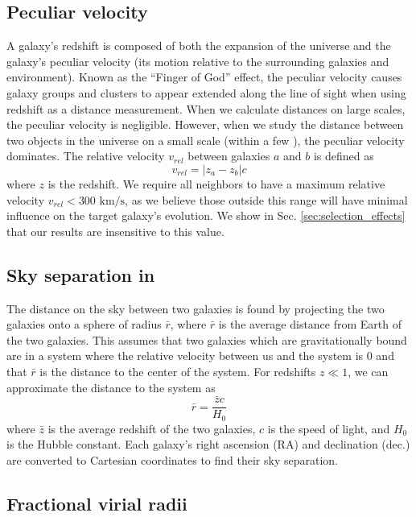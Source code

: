 \subsection{Peculiar velocity}

A galaxy's redshift is composed of both the expansion of the universe and the 
galaxy's peculiar velocity (its motion relative to the surrounding galaxies and 
environment).  Known as the ``Finger of God'' effect, the peculiar velocity 
causes galaxy groups and clusters to appear extended along the line of sight 
when using redshift as a distance measurement.  When we calculate distances on 
large scales, the peculiar velocity is negligible.  However, when we study the 
distance between two objects in the universe on a small scale (within a few 
\hMpc), the peculiar velocity dominates.  The relative velocity $v_{rel}$ 
between galaxies $a$ and $b$ is defined as
\begin{equation}
    v_{rel} = |z_a - z_b|c
\end{equation}
where $z$ is the redshift.  We require all 
neighbors to have a maximum relative velocity $v_{rel} < 300\text{ km/s}$, as we 
believe those outside this range will have minimal influence on the target 
galaxy's evolution.  We show in Sec. \ref{sec:selection_effects} that our 
results are insensitive to this value.


\subsection{Sky separation in \hMpc}

The distance on the sky between two galaxies is found by projecting the two 
galaxies onto a sphere of radius $\bar{r}$, where $\bar{r}$ is the average 
distance from Earth of the two galaxies.  This assumes that two galaxies which 
are gravitationally bound are in a system where the relative velocity between us 
and the system is 0 and that $\bar{r}$ is the distance to the center of the 
system.  For redshifts $z \ll 1$, we can approximate the distance to the system 
as
\begin{equation}
    \bar{r} = \frac{\bar{z}c}{H_0}
\end{equation}
where $\bar{z}$ is the average redshift of the two galaxies, $c$ is the speed of 
light, and $H_0$ is the Hubble constant.  Each galaxy's right ascension (RA) and 
declination (dec.) are converted to Cartesian coordinates to find their sky 
separation.


\subsection{Fractional virial radii}

